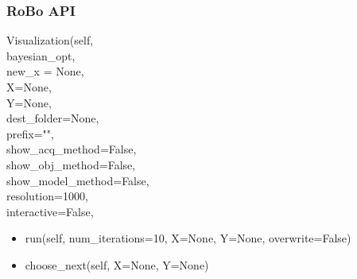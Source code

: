 \documentclass[10pt,handout]{beamer}
\begin{document}
\begin{frame}

\frametitle{RoBo API}
Visualization(self, \\
\hspace{1cm} bayesian\_opt,  \\
\hspace{1cm} new\_x = None, \\
\hspace{1cm} X=None, \\
\hspace{1cm} Y=None, \\
\hspace{1cm} dest\_folder=None, \\
\hspace{1cm} prefix="", \\
\hspace{1cm} show\_acq\_method=False, \\
\hspace{1cm} show\_obj\_method=False, \\
\hspace{1cm} show\_model\_method=False, \\
\hspace{1cm} resolution=1000, \\
\hspace{1cm} interactive=False, \\
\begin{itemize}
\item run(self, num\_iterations=10, X=None, Y=None, overwrite=False)
\item choose\_next(self, X=None, Y=None)
\end{itemize}
\end{frame}




\end{document}
